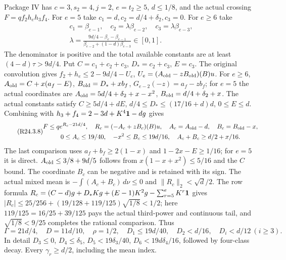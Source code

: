 Package IV has $c=3,s_2=4,j=2$, $e=t_2\ge5$, $d\le1/8$,
and the actual crossing $F=qf_2h_eh_3f_4$.
For $e=5$ take $c_1=d,c_2=d/4+\delta_2,c_3=0$.
For $e\ge6$ take
\[
\begin{gathered}
c_1=\beta_{e-1},\quad c_2=\lambda\beta_{e-2},\quad c_3=\lambda\beta_{e-3},\\
\lambda=\frac{9d/4-\beta_e-\beta_{e-1}}
{\beta_{e-2}+(1-d)\beta_{e-3}}\in[0,1].
\end{gathered}
\]
The denominator is positive and the total available constants are at
least $(4-d)\tau>9d/4$. Put $C=c_1+c_2+c_3$, $D_*=c_2+c_3$,
$E=c_3$. The original convolution gives
$f_2+h_e\le2-9d/4-U_e$,
$U_e=(A_{\rm old}-zB_{\rm old})(B)u$.
For $e\ge6$,
$A_{\rm old}=C+x(a_f-E)$, $B_{\rm old}=D_*+xb_f$,
$G_{e-2}(-z)=a_f-zb_f$; for $e=5$ the actual coordinates are
$A_{\rm old}=5d/4+\delta_2+x-x^2$,
$B_{\rm old}=d/4+\delta_2+x$.
The actual constants satisfy
$C\ge5d/4+dE$, $d/4\le D_*\le(17/16+d)d$, $0\le E\le d$.
Combining with $h_3+f_4=2-3d+K^4\mathbf1-dg$ gives
\begin{equation}\tag{R24.3.8}\label{eq:R24:crosscoordinates}
\begin{gathered}
F\le qe^{R_c-21d/4},\quad R_c=(-A_c+zB_c)(B)u,\quad
A_c=A_{\rm old}-d,\quad B_c=B_{\rm old}-x,\\
0\le A_c\le19/40,\quad-x^2\le B_c\le19d/16,\quad
A_c+B_c\ge d/2+x/16.
\end{gathered}
\end{equation}
The last comparison uses $a_f+b_f\ge2(1-x)$ and
$1-2x-E\ge1/16$; for $e=5$ it is direct.
$A_{\rm old}\le3/8+9d/5$ follows from
$x(1-x+x^2)\le5/16$ and the $C$ bound.
The coordinate $B_c$ can be negative and is retained with its sign.
The actual mixed mean is $-\int(A_c+B_c)\,d\nu\le0$ and
$\|R_c\|_2<\sqrt d/2$.
The row formula
$R_c=(C-d)g+D_*Kg+(E-1)K^2g-\sum_{r=5}^eK^r\mathbf1$
gives
$|R_c|\le25/256+(19/128+119/125)\sqrt{1/8}<1/2$;
here $119/125=16/25+39/125$ pays the actual third-power and continuous
tail, and $\sqrt{1/8}<9/25$ completes the rational comparison.
Thus
\begin{equation}\tag{R24.3.9}\label{eq:R24:IV}
\Gamma=21d/4,\quad D=11d/10,\quad\rho=1/2,\quad
D_1\le19d/40,\quad D_2<d/16,\quad D_i<d/12\ (i\ge3).
\end{equation}
In detail $D_3\le0$, $D_4\le\delta_5$,
$D_5<19\delta_3/40$, $D_6<19d\delta_4/16$, followed by four-class
decay. Every $\gamma_r\ge d/2$, including the mean index.

